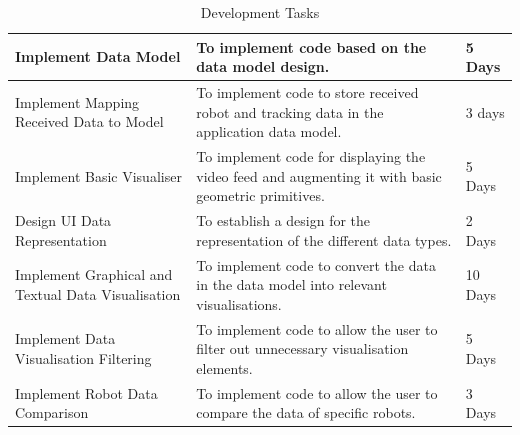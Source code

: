 \documentclass[titlepage,hidelinks,10pt]{article}
\begin{document}
\begin{table}[H]
\begin{tabular}[h]{ |>{\raggedright}p{5cm}|>{\raggedright}p{7cm}|p{3cm}| }
  Implement Data Model 								& To implement code based on the data model design. 																	& 5 Days \\ \hline
  Implement Mapping Received Data to Model 			& To implement code to store received robot and tracking data in the application data model. 							& 3 days \\ \hline
  Implement Basic Visualiser 						& To implement code for displaying the video feed and augmenting it with basic geometric primitives. 					& 5 Days \\ \hline
  Design UI Data Representation 					& To establish a design for the representation of the different data types. 											& 2 Days \\ \hline
  Implement Graphical and Textual Data Visualisation & To implement code to convert the data in the data model into relevant visualisations. 								& 10 Days \\ \hline
  Implement Data Visualisation Filtering 			& To implement code to allow the user to filter out unnecessary visualisation elements. 								& 5 Days \\ \hline
  Implement Robot Data Comparison 					& To implement code to allow the user to compare the data of specific robots. 											& 3 Days \\ \hline
\end{tabular}
\caption{Development Tasks\label{DevTaskTable}}
\end{table}
\end{document}
